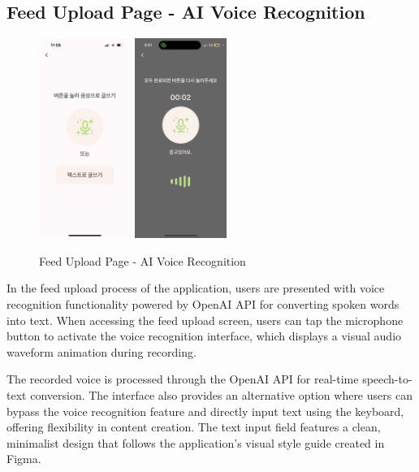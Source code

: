     \subsection{Feed Upload Page - AI Voice Recognition}
        \begin{figure}[htbp]
            \centerline{
            \includegraphics[width=3cm]{Images/page/recording1.jpg}
            \includegraphics[width=3cm]{Images/page/recording.png}}
              \caption{Feed Upload Page - AI Voice Recognition}
            \label{fig}
        \end{figure}
        In the feed upload process of the application, users are presented with voice recognition functionality powered by OpenAI API for converting spoken words into text. When accessing the feed upload screen, users can tap the microphone button to activate the voice recognition interface, which displays a visual audio waveform animation during recording.

        The recorded voice is processed through the OpenAI API for real-time speech-to-text conversion. The interface also provides an alternative option where users can bypass the voice recognition feature and directly input text using the keyboard, offering flexibility in content creation. The text input field features a clean, minimalist design that follows the application's visual style guide created in Figma.

